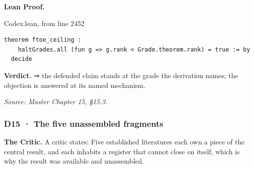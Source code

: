 \documentclass[10pt,twocolumn]{article}
\begin{document}
\textbf{Lean Proof.}

\begin{leanexcerpt}{Codex.lean, from line 2452}
\begin{lstlisting}[style=leanx,firstnumber=2452]
theorem ftoe_ceiling :
    haltGrades.all (fun g => g.rank < Grade.theorem.rank) = true := by
  decide
\end{lstlisting}
\end{leanexcerpt}

\textbf{Verdict.} ⇒ the defended claim stands at the grade the
derivation names; the objection is answered at its named mechanism.

\emph{Source: Master Chapter 15, §15.3.}

\hypertarget{d15-the-five-unassembled-fragments}{%
\subsubsection{D15 · The five unassembled
fragments}\label{d15-the-five-unassembled-fragments}}

\textbf{The Critic.} A critic states: Five established literatures each
own a piece of the central result, and each inhabits a register that
cannot close on itself, which is why the result was available and
unassembled.
\end{document}
